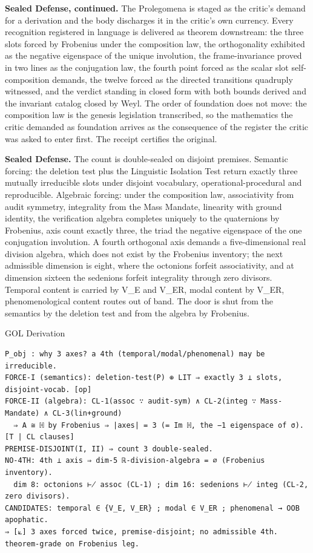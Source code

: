 \documentclass[10pt,twocolumn]{article}
\begin{document}
\textbf{Sealed Defense, continued.} The Prolegomena is staged as the
critic's demand for a derivation and the body discharges it in the
critic's own currency. Every recognition registered in language is
delivered as theorem downstream: the three slots forced by Frobenius
under the composition law, the orthogonality exhibited as the negative
eigenspace of the unique involution, the frame-invariance proved in two
lines as the conjugation law, the fourth point forced as the scalar slot
self-composition demands, the twelve forced as the directed transitions
quadruply witnessed, and the verdict standing in closed form with both
bounds derived and the invariant catalog closed by Weyl. The order of
foundation does not move: the composition law is the genesis legislation
transcribed, so the mathematics the critic demanded as foundation
arrives as the consequence of the register the critic was asked to enter
first. The receipt certifies the original.

\textbf{Sealed Defense.} The count is double-sealed on disjoint
premises. Semantic forcing: the deletion test plus the Linguistic
Isolation Test return exactly three mutually irreducible slots under
disjoint vocabulary, operational-procedural and reproducible. Algebraic
forcing: under the composition law, associativity from audit symmetry,
integrality from the Mass Mandate, linearity with ground identity, the
verification algebra completes uniquely to the quaternions by Frobenius,
axis count exactly three, the triad the negative eigenspace of the one
conjugation involution. A fourth orthogonal axis demands a
five-dimensional real division algebra, which does not exist by the
Frobenius inventory; the next admissible dimension is eight, where the
octonions forfeit associativity, and at dimension sixteen the sedenions
forfeit integrality through zero divisors. Temporal content is carried
by V\_E and V\_ER, modal content by V\_ER, phenomenological content
routes out of band. The door is shut from the semantics by the deletion
test and from the algebra by Frobenius.

\begin{golbox}{GOL Derivation}
\begin{lstlisting}[style=golv]
P_obj : why 3 axes? a 4th (temporal/modal/phenomenal) may be irreducible.
FORCE-I (semantics): deletion-test(P) ⊕ LIT ⇒ exactly 3 ⊥ slots, disjoint-vocab. [op]
FORCE-II (algebra): CL-1(assoc ∵ audit-sym) ∧ CL-2(integ ∵ Mass-Mandate) ∧ CL-3(lin+ground)
  ⇒ A ≅ ℍ by Frobenius ⇒ |axes| = 3 (= Im ℍ, the −1 eigenspace of σ).  [T | CL clauses]
PREMISE-DISJOINT(I, II) ⇒ count 3 double-sealed.
NO-4TH: 4th ⊥ axis ⇒ dim-5 ℝ-division-algebra = ∅ (Frobenius inventory).
  dim 8: octonions ⊬ assoc (CL-1) ; dim 16: sedenions ⊬ integ (CL-2, zero divisors).
CANDIDATES: temporal ∈ {V_E, V_ER} ; modal ∈ V_ER ; phenomenal → OOB apophatic.
⇒ [⟀] 3 axes forced twice, premise-disjoint; no admissible 4th. theorem-grade on Frobenius leg.
\end{lstlisting}
\end{golbox}
\end{document}
